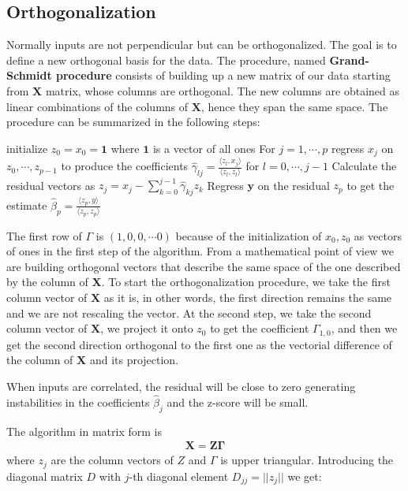 \documentclass[12pt, letterpaper]{article}
\theoremstyle{definition}
\newcommand{\X}{\mathrm{\mathbf{X}}}
\begin{document}
\subsection{Orthogonalization}
Normally inputs are not perpendicular but can be orthogonalized. The goal is to define a new orthogonal basis for the data. The procedure, named \textbf{Grand-Schmidt procedure} consists of building up a new matrix of our data starting from $\X$ matrix, whose columns are orthogonal. The new columns are obtained as linear combinations of the columns of $\X$, hence they span the same space. The procedure can be summarized in the following steps:
\begin{algorithm}[!ht]
initialize $z_0=x_0=\mathbf{1}$ where $\mathbf{1}$ is a vector of all ones\;
For $j=1,\cdots, p$ regress $x_j$ on $z_0,\cdots, z_{p-1}$ to produce the coefficients $\hat{\gamma}_{lj}= \frac{\langle z_l , x_j\rangle}{\langle z_l , z_l\rangle}$ for $l=0,\cdots, j-1$\;
Calculate the residual vectors as $z_j = x_j - \sum_{k=0}^{j-1} \hat{\gamma}_{kj}z_k$\;
Regress $\mathbf{y}$ on the residual $z_p$ to get the estimate $\hat{\beta}_p = \frac{\langle z_p, y\rangle}{\langle z_p , z_p\rangle}$
\end{algorithm}
The first row of $\Gamma$ is $(1, 0, 0,\cdots 0)$ because of the initialization of
$x_0, z_0$ as vectors of ones in the first step of the algorithm. From a mathematical point of view we are building orthogonal vectors that describe the same space of the one described by the column of $\X$. To start the orthogonalization procedure, we take the first column vector of $\X$ as it is, in other words, the first direction
remains the same and we are not rescaling the vector. At the second step, we take the second column vector of $\X$, we project it onto $z_0$ to get the coefficient $\Gamma_{1,0}$, and then we get the second direction orthogonal to the first one as the vectorial difference of the column of $\X$ and its projection.

When inputs are correlated, the residual will be close to zero generating instabilities in the coefficients $\hat{\beta}_j$ and the z-score will be small.

The algorithm in matrix form is
\begin{align*}
\mathbf{X = Z\Gamma}
\end{align*}
where $z_j$ are the column vectors of $Z$ and $\Gamma$ is upper triangular. Introducing the diagonal matrix $D$ with $j$-th diagonal element $D_{jj}=||z_j||$ we get:
\end{document}
